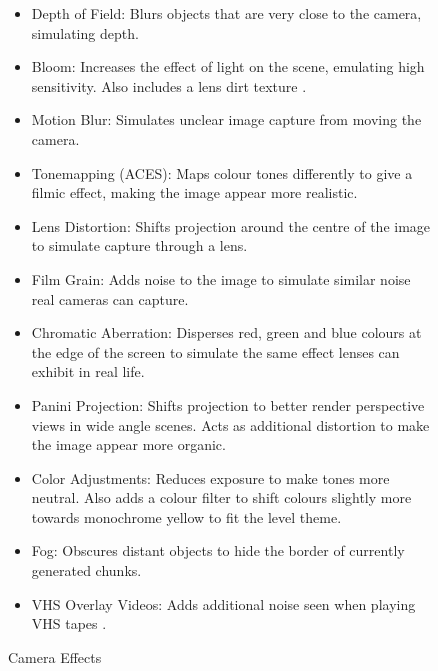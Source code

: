 \begin{figure}[H]
    \begin{framed}
        \begin{itemize}
            \item Depth of Field: Blurs objects that are very close to the camera, simulating depth.
            \item Bloom: Increases the effect of light on the scene, emulating high sensitivity. Also includes a lens dirt texture \cite{actionvfx_lens_dirt}.
            \item Motion Blur: Simulates unclear image capture from moving the camera.
            \item Tonemapping (ACES): Maps colour tones differently to give a filmic effect, making the image appear more realistic.
            \item Lens Distortion: Shifts projection around the centre of the image to simulate capture through a lens.
            \item Film Grain: Adds noise to the image to simulate similar noise real cameras can capture.
            \item Chromatic Aberration: Disperses red, green and blue colours at the edge of the screen to simulate the same effect lenses can exhibit in real life.
            \item Panini Projection: Shifts projection to better render perspective views in wide angle scenes. Acts as additional distortion to make the image appear more organic.
            \item Color Adjustments: Reduces exposure to make tones more neutral. Also adds a colour filter to shift colours slightly more towards monochrome yellow to fit the level theme.
            \item Fog: Obscures distant objects to hide the border of currently generated chunks.
            \item VHS Overlay Videos: Adds additional noise seen when playing VHS tapes \cite{vhsGraphicsGuide, enchanted_media, youtube_video3}.
        \end{itemize}
    \end{framed}
    \caption{Camera Effects}
    \label{fig:cameraEffects}
\end{figure}

